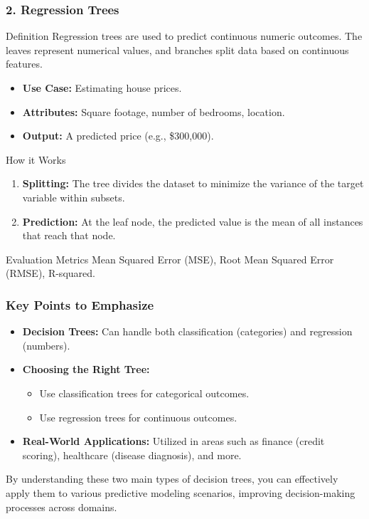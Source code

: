 \documentclass[aspectratio=169]{beamer}
\begin{document}
\begin{frame}[fragile]
    \frametitle{2. Regression Trees}
    
    \begin{block}{Definition}
        Regression trees are used to predict continuous numeric outcomes. The leaves represent numerical values, and branches split data based on continuous features.
    \end{block}
    
    \begin{itemize}
        \item \textbf{Use Case:} Estimating house prices.
        \item \textbf{Attributes:} Square footage, number of bedrooms, location.
        \item \textbf{Output:} A predicted price (e.g., \$300,000).
    \end{itemize}

    \begin{block}{How it Works}
        \begin{enumerate}
            \item \textbf{Splitting:} The tree divides the dataset to minimize the variance of the target variable within subsets.
            \item \textbf{Prediction:} At the leaf node, the predicted value is the mean of all instances that reach that node.
        \end{enumerate}
    \end{block}

    \begin{block}{Evaluation Metrics}
        Mean Squared Error (MSE), Root Mean Squared Error (RMSE), R-squared.
    \end{block}
\end{frame}

\begin{frame}[fragile]
    \frametitle{Key Points to Emphasize}
    \begin{itemize}
        \item \textbf{Decision Trees:} Can handle both classification (categories) and regression (numbers).
        \item \textbf{Choosing the Right Tree:}
        \begin{itemize}
            \item Use classification trees for categorical outcomes.
            \item Use regression trees for continuous outcomes.
        \end{itemize}
        \item \textbf{Real-World Applications:} Utilized in areas such as finance (credit scoring), healthcare (disease diagnosis), and more.
    \end{itemize}
    
    By understanding these two main types of decision trees, you can effectively apply them to various predictive modeling scenarios, improving decision-making processes across domains.
\end{frame}
\end{document}

